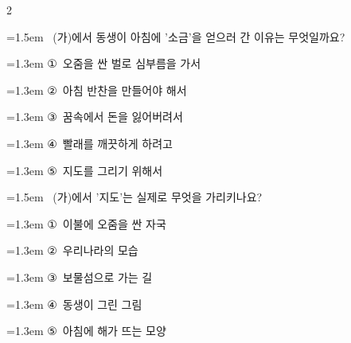 \documentclass[12pt, a4paper]{article}
\begin{document}
\begin{multicols}{2}
\noindent\begin{minipage}{\columnwidth}
\vspace{2mm}
{\hangindent=1.5em  ~(가)에서 동생이 아침에 '소금'을 얻으러 간 이유는 무엇일까요?\par}

\vspace{0.5mm}
{\hangindent=1.3em  \noindent\hspace{0.3em}①~오줌을 싼 벌로 심부름을 가서\par}
{\hangindent=1.3em  \noindent\hspace{0.3em}②~아침 반찬을 만들어야 해서\par}
{\hangindent=1.3em  \noindent\hspace{0.3em}③~꿈속에서 돈을 잃어버려서\par}
{\hangindent=1.3em  \noindent\hspace{0.3em}④~빨래를 깨끗하게 하려고\par}
{\hangindent=1.3em  \noindent\hspace{0.3em}⑤~지도를 그리기 위해서\par}
\vspace{4mm}
\end{minipage}
\par

\noindent\begin{minipage}{\columnwidth}
\vspace{2mm}
{\hangindent=1.5em  ~(가)에서 '지도'는 실제로 무엇을 가리키나요?\par}

\vspace{0.5mm}
{\hangindent=1.3em  \noindent\hspace{0.3em}①~이불에 오줌을 싼 자국\par}
{\hangindent=1.3em  \noindent\hspace{0.3em}②~우리나라의 모습\par}
{\hangindent=1.3em  \noindent\hspace{0.3em}③~보물섬으로 가는 길\par}
{\hangindent=1.3em  \noindent\hspace{0.3em}④~동생이 그린 그림\par}
{\hangindent=1.3em  \noindent\hspace{0.3em}⑤~아침에 해가 뜨는 모양\par}
\vspace{4mm}
\end{minipage}
\par


\end{multicols}
\end{document}
